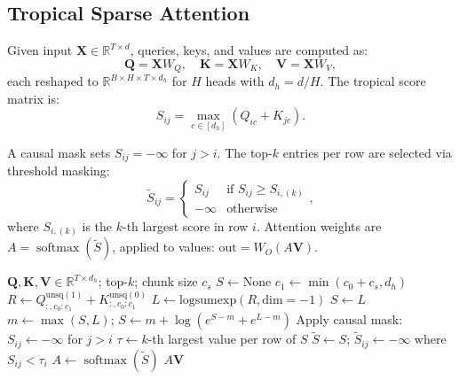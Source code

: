 \documentclass[11pt,a4paper]{article}
\DeclareMathOperator{\softmax}{softmax}
\newcommand{\R}{\mathbb{R}}
\begin{document}
\subsection{Tropical Sparse Attention}
\label{sec:trop_attn}

Given input $\bm{X} \in \R^{T \times d}$, queries, keys, and values
are computed as:
\begin{equation}
\bm{Q} = \bm{X} W_Q, \quad
\bm{K} = \bm{X} W_K, \quad
\bm{V} = \bm{X} W_V,
\end{equation}
each reshaped to $\R^{B \times H \times T \times d_h}$ for $H$ heads
with $d_h = d/H$.  The tropical score matrix is:
\begin{equation}
S_{ij} = \max_{c \in [d_h]} (Q_{ic} + K_{jc}).
\label{eq:trop_score}
\end{equation}

A causal mask sets $S_{ij} = -\infty$ for $j > i$.  The top-$k$
entries per row are selected via threshold masking:
\begin{equation}
\tilde{S}_{ij} = \begin{cases}
  S_{ij} & \text{if } S_{ij} \geq S_{i,(k)} \\
  -\infty & \text{otherwise}
\end{cases},
\end{equation}
where $S_{i,(k)}$ is the $k$-th largest score in row $i$.  Attention
weights are $A = \softmax(\tilde{S})$, applied to values:
$\text{out} = W_O (A \bm{V})$.

\begin{algorithm}[t]
\caption{Tropical Sparse Attention (single head)}
\label{alg:trop_attn}
\begin{algorithmic}[1]
\REQUIRE $\bm{Q}, \bm{K}, \bm{V} \in \R^{T \times d_h}$; top-$k$;
  chunk size $c_s$
\STATE $S \leftarrow \text{None}$
  \STATE $c_1 \leftarrow \min(c_0 + c_s, d_h)$
  \STATE $R \leftarrow Q_{:,c_0:c_1}^{\text{unsq}(1)} +
    K_{:,c_0:c_1}^{\text{unsq}(0)}$
  \STATE $L \leftarrow \text{logsumexp}(R, \text{dim}=-1)$
    \STATE $S \leftarrow L$
  \ELSE
    \STATE $m \leftarrow \max(S, L)$; \quad
      $S \leftarrow m + \log(e^{S-m} + e^{L-m})$
  \ENDIF
\ENDFOR
\STATE Apply causal mask: $S_{ij} \leftarrow -\infty$ for $j > i$
\STATE $\tau \leftarrow k$-th largest value per row of $S$
\STATE $\tilde{S} \leftarrow S$; \quad
  $\tilde{S}_{ij} \leftarrow -\infty$ where $S_{ij} < \tau_i$
\STATE $A \leftarrow \softmax(\tilde{S})$
\RETURN $A \bm{V}$
\end{algorithmic}
\end{algorithm}
\end{document}
